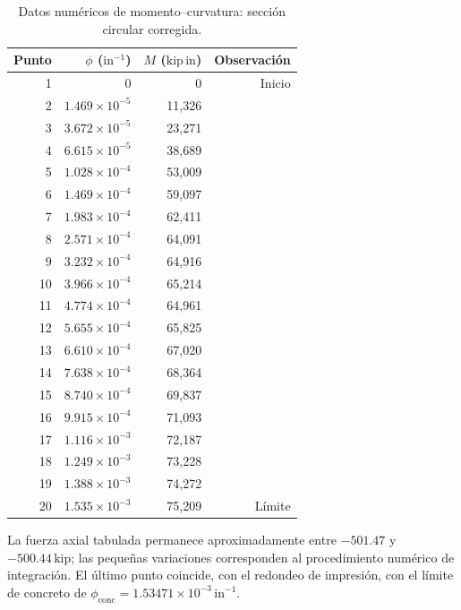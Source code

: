 \documentclass[11pt,a4paper]{article}
\begin{document}
\begin{table}[H]
\centering
\small
\caption{Datos numéricos de momento--curvatura: sección circular corregida.}
\setlength{\tabcolsep}{6pt}
\begin{tabular}{r r r r}
\toprule
\textbf{Punto} & \textbf{$\phi$ ($\mathrm{in}^{-1}$)} &
\textbf{$M$ ($\mathrm{kip\,in}$)} & \textbf{Observación}\\
\midrule
 1 & 0             & 0      & Inicio\\
 2 & $1.469\times10^{-5}$ & 11,326 & \\
 3 & $3.672\times10^{-5}$ & 23,271 & \\
 4 & $6.615\times10^{-5}$ & 38,689 & \\
 5 & $1.028\times10^{-4}$ & 53,009 & \\
 6 & $1.469\times10^{-4}$ & 59,097 & \\
 7 & $1.983\times10^{-4}$ & 62,411 & \\
 8 & $2.571\times10^{-4}$ & 64,091 & \\
 9 & $3.232\times10^{-4}$ & 64,916 & \\
10 & $3.966\times10^{-4}$ & 65,214 & \\
11 & $4.774\times10^{-4}$ & 64,961 & \\
12 & $5.655\times10^{-4}$ & 65,825 & \\
13 & $6.610\times10^{-4}$ & 67,020 & \\
14 & $7.638\times10^{-4}$ & 68,364 & \\
15 & $8.740\times10^{-4}$ & 69,837 & \\
16 & $9.915\times10^{-4}$ & 71,093 & \\
17 & $1.116\times10^{-3}$ & 72,187 & \\
18 & $1.249\times10^{-3}$ & 73,228 & \\
19 & $1.388\times10^{-3}$ & 74,272 & \\
20 & $1.535\times10^{-3}$ & 75,209 & Límite\\
\bottomrule
\end{tabular}
\end{table}

La fuerza axial tabulada permanece aproximadamente entre
$-501.47$ y $-500.44\,\mathrm{kip}$; las pequeñas variaciones
corresponden al procedimiento numérico de integración. El último punto
coincide, con el redondeo de impresión, con el límite de concreto de
$\phi_{\mathrm{conc}}=1.53471\times10^{-3}\,\mathrm{in}^{-1}$.
\end{document}
